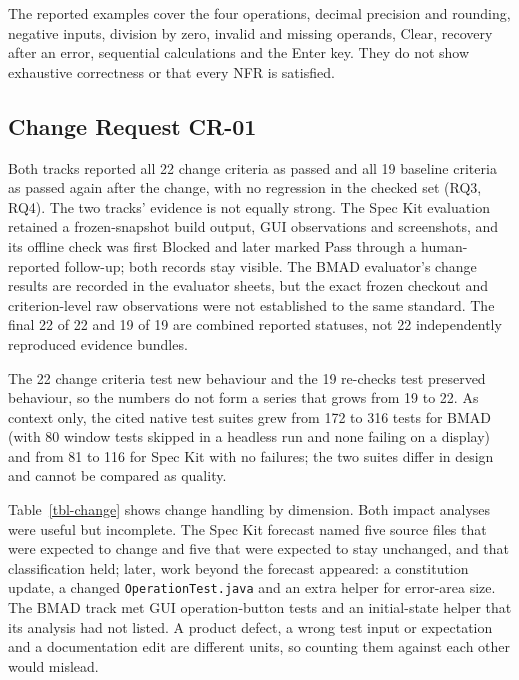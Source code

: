\documentclass[conference]{IEEEtran}
\begin{document}
The reported examples cover the four operations, decimal precision and
rounding, negative inputs, division by zero, invalid and missing
operands, Clear, recovery after an error, sequential calculations and
the Enter key. They do not show exhaustive correctness or that every NFR
is satisfied.

\subsection{Change Request CR-01}\label{change-request-cr-01}

Both tracks reported all 22 change criteria as passed and all 19
baseline criteria as passed again after the change, with no regression
in the checked set (RQ3, RQ4). The two tracks' evidence is not equally
strong. The Spec Kit evaluation retained a frozen-snapshot build output,
GUI observations and screenshots, and its offline check was first
Blocked and later marked Pass through a human-reported follow-up; both
records stay visible. The BMAD evaluator's change results are recorded
in the evaluator sheets, but the exact frozen checkout and
criterion-level raw observations were not established to the same
standard. The final 22 of 22 and 19 of 19 are combined reported
statuses, not 22 independently reproduced evidence bundles.

The 22 change criteria test new behaviour and the 19 re-checks test
preserved behaviour, so the numbers do not form a series that grows from
19 to 22. As context only, the cited native test suites grew from 172 to
316 tests for BMAD (with 80 window tests skipped in a headless run and
none failing on a display) and from 81 to 116 for Spec Kit with no
failures; the two suites differ in design and cannot be compared as
quality.

Table~\ref{tbl-change} shows change handling by dimension. Both
impact analyses were useful but incomplete. The Spec Kit forecast named
five source files that were expected to change and five that were
expected to stay unchanged, and that classification held; later, work
beyond the forecast appeared: a constitution update, a changed
\texttt{OperationTest.java} and an extra helper for error-area size. The
BMAD track met GUI operation-button tests and an initial-state helper
that its analysis had not listed. A product defect, a wrong test input
or expectation and a documentation edit are different units, so counting
them against each other would mislead.
\end{document}
